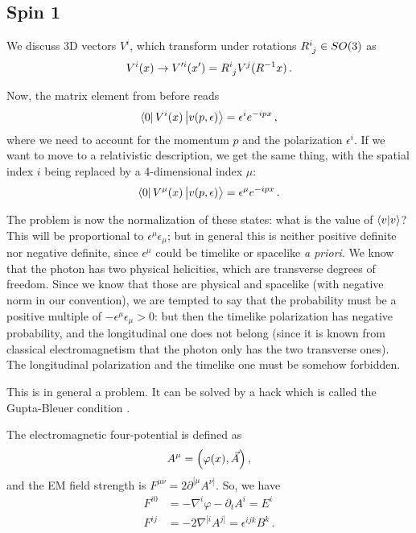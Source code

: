 \documentclass[main.tex]{subfiles}
\begin{document}
\subsection{Spin 1}

We discuss 3D vectors \(V^{i}\), which transform under rotations \(\tensor{R}{^{i}_{j}} \in SO(3)\) as 
%
\begin{align}
V^{i} (x) \rightarrow V^{\prime i} (x') = \tensor{R}{^{i}_{j}} V^{j} (R^{-1}x)
\,.
\end{align}


Now, the matrix element from before reads 
%
\begin{align}
\bra{0} V^{i}(x) \ket{v(p, \epsilon )} = \epsilon^{i} e^{-ipx}
\,,
\end{align}
%
where we need to account for the momentum \(p\) and the polarization \(\epsilon^{i} \). 
If we want to move to a relativistic description, we get the same thing, with the spatial index \(i\) being replaced by a 4-dimensional index \(\mu \):
%
\begin{align}
\bra{0} V^{\mu }(x) \ket{v(p, \epsilon )} = \epsilon^{\mu } e^{-ipx}
\,.
\end{align}

The problem is now the normalization of these states: what is the value of \(\braket{v}{v}\)? 
This will be proportional to  \(\epsilon^{\mu } \epsilon_{\mu }\); but in general this is neither positive definite nor negative definite, since \(\epsilon^{\mu }\) could be timelike or spacelike \emph{a priori}. 
We know that the photon has two physical helicities, which are transverse degrees of freedom.
Since we know that those are physical and spacelike (with negative norm in our convention), we are tempted to say that the probability must be a positive multiple of \(-\epsilon^{\mu }\epsilon_{\mu } > 0\): but then the timelike polarization has negative probability, and the longitudinal one does not belong (since it is known from classical electromagnetism that the photon only has the two transverse ones).
The longitudinal polarization and the timelike one must be somehow forbidden.

This is in general a problem. It can be solved by a hack which is called the Gupta-Bleuer condition \cite[sec.\ 2.8]{tissinoTheoreticalPhysicsNotes2020}.

The electromagnetic four-potential is defined as 
%
\begin{align}
A^{\mu }  = \qty(\varphi (x), \vec{A})
\,,
\end{align}
%
and the EM field strength is \(F^{\mu \nu } = 2 \partial^{[\mu } A^{\nu ]}\). So, we have 
%
\begin{subequations}
\begin{align}
F^{i0} &= - \nabla^{i} \varphi - \partial_{t} A^{i} = E^{i}  \\
 F^{ij} &=  - 2\nabla^{[i} A^{j]} = \epsilon^{ijk} B^{k}
\,.
\end{align}
\end{subequations}
\end{document}
